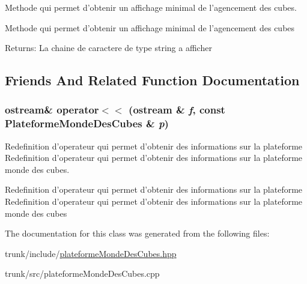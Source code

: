 Methode qui permet d'obtenir un affichage minimal de l'agencement des cubes. 

Methode qui permet d'obtenir un affichage minimal de l'agencement des cubes

\begin{Desc}
\item[Returns:]La chaine de caractere de type string a afficher \end{Desc}


\subsection{Friends And Related Function Documentation}
\hypertarget{classPlateformeMondeDesCubes_98d6997efa9a51e23997364f1f09c7bd}{
\subsubsection[{operator$<$$<$}]{\setlength{\rightskip}{0pt plus 5cm}ostream\& operator$<$$<$ (ostream \& {\em f}, \/  const {\bf PlateformeMondeDesCubes} \& {\em p})}}
\label{classPlateformeMondeDesCubes_98d6997efa9a51e23997364f1f09c7bd}


Redefinition d'operateur qui permet d'obtenir des informations sur la plateforme Redefinition d'operateur qui permet d'obtenir des informations sur la plateforme monde des cubes. 

Redefinition d'operateur qui permet d'obtenir des informations sur la plateforme Redefinition d'operateur qui permet d'obtenir des informations sur la plateforme monde des cubes 

The documentation for this class was generated from the following files:\begin{CompactItemize}
\item 
trunk/include/\hyperlink{plateformeMondeDesCubes_8hpp}{plateformeMondeDesCubes.hpp}\item 
trunk/src/plateformeMondeDesCubes.cpp\end{CompactItemize}
